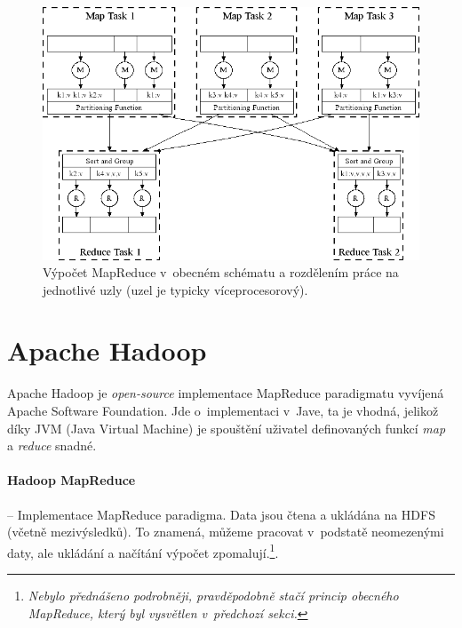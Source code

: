 \begin{figure}[H]
    \centering
    \includegraphics[width=1\linewidth]{map_reduce_general_p2.png}
    \caption{Výpočet MapReduce v~obecném schématu a rozdělením práce na jednotlivé uzly (uzel je typicky víceprocesorový).}
\end{figure}


\section{Apache Hadoop}


Apache Hadoop je \textit{open-source} implementace MapReduce paradigmatu vyvíjená Apache Software Foundation. Jde o~implementaci v~Jave, ta je vhodná, jelikož díky JVM (Java Virtual Machine) je spouštění uživatel definovaných funkcí \textit{map} a \textit{reduce} snadné.

\paragraph*{Hadoop MapReduce} -- Implementace MapReduce paradigma. Data jsou čtena a ukládána na HDFS (včetně mezivýsledků). To znamená, můžeme pracovat v~podstatě neomezenými daty, ale ukládání a načítání výpočet zpomalují.\footnote{\textit{Nebylo přednášeno podrobněji, pravděpodobně stačí princip obecného MapReduce, který byl vysvětlen v~předchozí sekci.}}.


